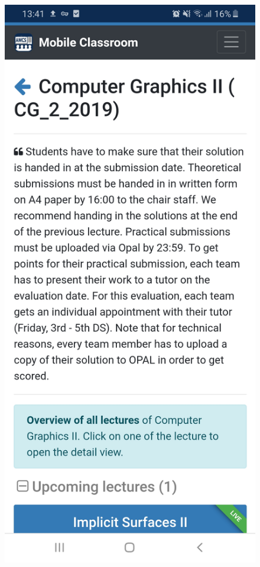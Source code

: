 \begin{figure}
	\centering
	\begin{minipage}[t]{.5\textwidth}
		\centering
		\includegraphics[width=0.95\linewidth]{screenshots/course_view_1.jpg}

\end{minipage}
\end{figure}

